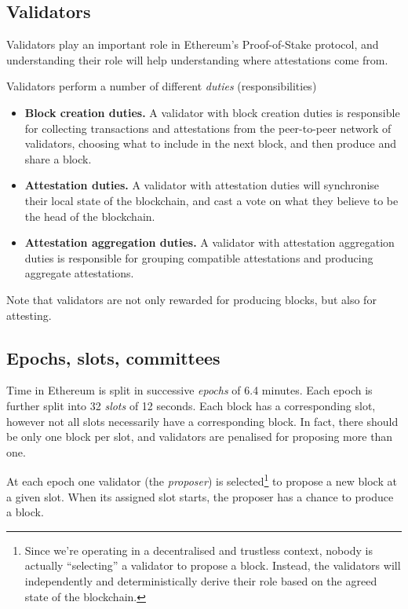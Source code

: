 \documentclass{article}
\begin{document}
\subsection{Validators}

Validators play an important role in Ethereum's Proof-of-Stake protocol,
and understanding their role will help understanding where attestations
come from.

Validators perform a number of different \emph{duties} (responsibilities)
%
\begin{itemize}
  \item \textbf{Block creation duties.} A validator with block creation duties
  is responsible for collecting transactions and attestations from the
  peer-to-peer network of validators, choosing what to include in the next
  block, and then produce and share a block.
  \item \textbf{Attestation duties.} A validator with attestation duties will
  synchronise their local state of the blockchain, and cast a vote on what they
  believe to be the head of the blockchain.
  \item \textbf{Attestation aggregation duties.} A validator with attestation
  aggregation duties is responsible for grouping compatible attestations and
  producing aggregate attestations.
\end{itemize}
%
Note that validators are not only rewarded for producing blocks, but also for
attesting. 

\subsection{Epochs, slots, committees}

Time in Ethereum is split in successive \emph{epochs} of 6.4 minutes.  Each
epoch is further split into 32 \emph{slots} of 12 seconds. Each block has a
corresponding slot, however not all slots necessarily have a corresponding
block. In fact, there should be only one block per slot, and validators are
penalised for proposing more than one.

At each epoch one validator (the \emph{proposer}) is selected\footnote{Since
we're operating in a decentralised and trustless context, nobody is actually
``selecting'' a validator to propose a block. Instead, the validators will
independently and deterministically derive their role based on the agreed state
of the blockchain.} to propose a new block at a given slot. When its assigned
slot starts, the proposer has a chance to produce a block.
\end{document}
